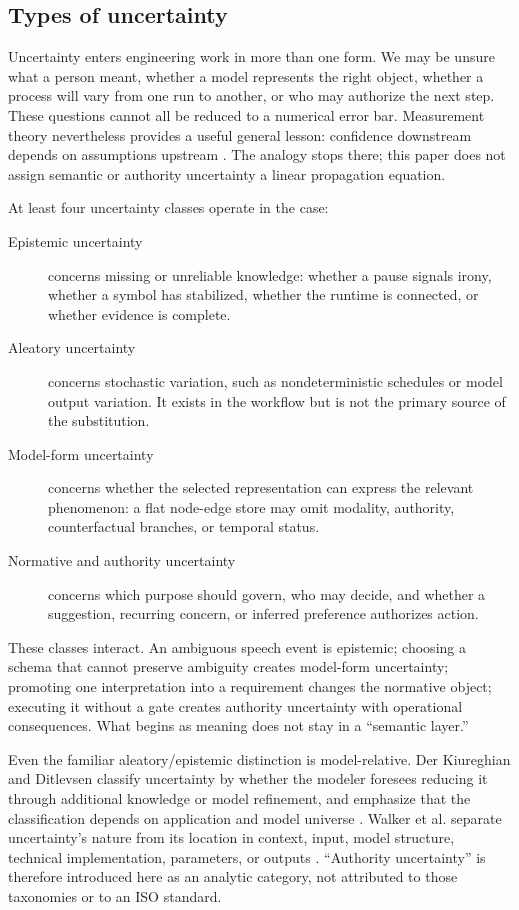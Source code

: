 \documentclass[10pt,a4paper]{article}
\begin{document}
\subsection{Types of uncertainty}

Uncertainty enters engineering work in more than one form. We may be unsure what a person meant, whether a model represents the right object, whether a process will vary from one run to another, or who may authorize the next step. These questions cannot all be reduced to a numerical error bar. Measurement theory nevertheless provides a useful general lesson: confidence downstream depends on assumptions upstream \cite{gum2008}. The analogy stops there; this paper does not assign semantic or authority uncertainty a linear propagation equation.

At least four uncertainty classes operate in the case:

\begin{description}
  \item[Epistemic uncertainty] concerns missing or unreliable knowledge: whether a pause signals irony, whether a symbol has stabilized, whether the runtime is connected, or whether evidence is complete.
  \item[Aleatory uncertainty] concerns stochastic variation, such as nondeterministic schedules or model output variation. It exists in the workflow but is not the primary source of the substitution.
  \item[Model-form uncertainty] concerns whether the selected representation can express the relevant phenomenon: a flat node-edge store may omit modality, authority, counterfactual branches, or temporal status.
  \item[Normative and authority uncertainty] concerns which purpose should govern, who may decide, and whether a suggestion, recurring concern, or inferred preference authorizes action.
\end{description}

These classes interact. An ambiguous speech event is epistemic; choosing a schema that cannot preserve ambiguity creates model-form uncertainty; promoting one interpretation into a requirement changes the normative object; executing it without a gate creates authority uncertainty with operational consequences. What begins as meaning does not stay in a ``semantic layer.''

Even the familiar aleatory/epistemic distinction is model-relative. Der Kiureghian and Ditlevsen classify uncertainty by whether the modeler foresees reducing it through additional knowledge or model refinement, and emphasize that the classification depends on application and model universe \cite{derkiureghian2009}. Walker et al. separate uncertainty's nature from its location in context, input, model structure, technical implementation, parameters, or outputs \cite{walker2003}. ``Authority uncertainty'' is therefore introduced here as an analytic category, not attributed to those taxonomies or to an ISO standard.
\end{document}
